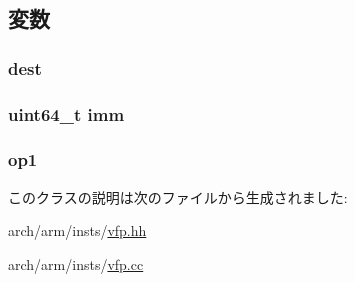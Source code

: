 \subsection{変数}
\hypertarget{classArmISA_1_1FpRegRegImmOp_aec72e8e45bdc87abeeeb75d2a8a9a716}{
\subsubsection[{dest}]{ {\bf dest}}}
\label{classArmISA_1_1FpRegRegImmOp_aec72e8e45bdc87abeeeb75d2a8a9a716}
\hypertarget{classArmISA_1_1FpRegRegImmOp_a2b4406ad2843b5aa12d244d01d8fdc69}{
\subsubsection[{imm}]{\setlength{\rightskip}{0pt plus 5cm}uint64\_\-t {\bf imm}}}
\label{classArmISA_1_1FpRegRegImmOp_a2b4406ad2843b5aa12d244d01d8fdc69}
\hypertarget{classArmISA_1_1FpRegRegImmOp_a4c465c43ad568f8bcf8ae71480e9cfea}{
\subsubsection[{op1}]{ {\bf op1}}}
\label{classArmISA_1_1FpRegRegImmOp_a4c465c43ad568f8bcf8ae71480e9cfea}


このクラスの説明は次のファイルから生成されました:\begin{DoxyCompactItemize}
\item 
arch/arm/insts/\hyperlink{vfp_8hh}{vfp.hh}\item 
arch/arm/insts/\hyperlink{vfp_8cc}{vfp.cc}\end{DoxyCompactItemize}
